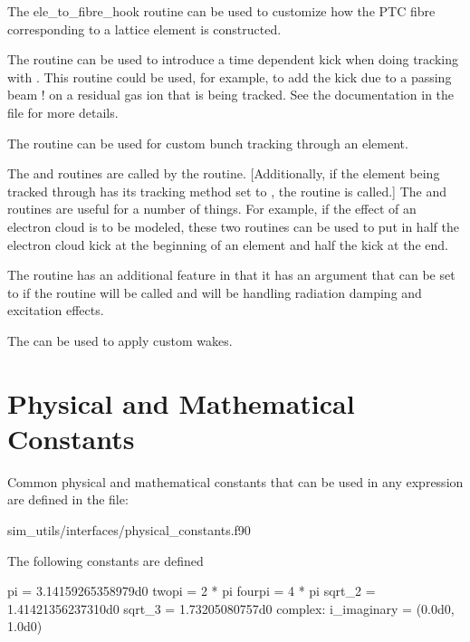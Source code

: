 {{{{{{The {ele_to_fibre_hook} routine can be used to customize how the PTC fibre corresponding to a
\bmad lattice element is constructed. 

The  routine can be used to introduce a time dependent kick
when doing tracking with . This routine could be used, for example, to add the
kick due to a passing beam ! on a residual gas ion that is being tracked. See the documentation in
the file  for more details.

The  routine can be used for custom bunch tracking through an element.

The  and  routines are called by the
 routine. [Additionally, if the element being tracked through has its
tracking method set to , the  routine is called.] The
 and  routines are useful for a number of things. For
example, if the effect of an electron cloud is to be modeled, these two routines can be used to put
in half the electron cloud kick at the beginning of an element and half the kick at the end.

The routine  has an additional feature in that it has an argument
 that can be set to  if the routine  will be
called and  will be handling radiation damping and excitation effects.

The  can be used to apply custom wakes.

\section{Physical and Mathematical Constants}
\label{s:physical.constants}

Common physical and mathematical constants that can be used in any expression
are defined in the file:
\begin{example}
 sim_utils/interfaces/physical_constants.f90
\end{example}

The following constants are defined
\begin{example}
  pi = 3.14159265358979d0
  twopi = 2 * pi
  fourpi = 4 * pi
  sqrt_2 = 1.41421356237310d0
  sqrt_3 = 1.73205080757d0
  complex: i_imaginary = (0.0d0, 1.0d0)


\end{example}}}}}}}
